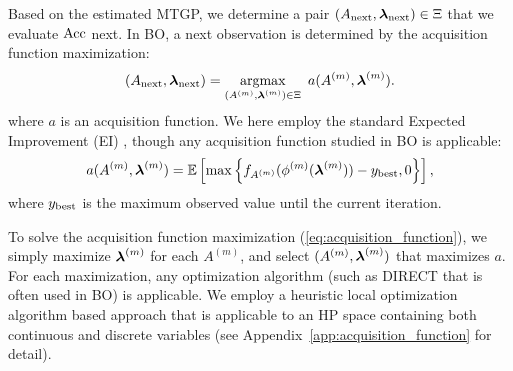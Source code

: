 Based on the estimated MTGP, we determine a pair
$(A_{\mathrm{next}}, \boldsymbol{\lambda}_{\mathrm{next}}) \in \Xi$
that we evaluate $\mathrm{Acc}$ next.
%
In BO, a next observation is determined by the acquisition function maximization: 
\begin{align}
 (A_{\mathrm{next}}, \boldsymbol{\lambda}_{\mathrm{next}}) = 
 \mathop{\text{argmax}}_{( A^{(m)}, \boldsymbol{\lambda}^{(m)} ) \in \Xi} \
 a(A^{(m)}, \boldsymbol{\lambda}^{(m)}). 
 \label{eq:acquisition_function}
\end{align}
where $a$ is an acquisition function. 
%
We here employ the standard Expected Improvement (EI) \cite{brochu2010tutorial}, though any acquisition function studied in BO is applicable:
\begin{align}
 a(A^{(m)}, \boldsymbol{\lambda}^{(m)})
 = 
 \mathbb{E}\left[
 \max \left\{
 f_{A^{(m)}}( \phi^{(m)}( \boldsymbol{\lambda}^{(m)} ) ) - y_{\rm best}, 0
 \right\}
 \right], 
 \label{eq:EI}
\end{align}
where 
$y_{\rm best}$
is the maximum observed value until the current iteration.


To solve the acquisition function maximization 
(\ref{eq:acquisition_function}), 
we simply maximize $\boldsymbol{\lambda}^{(m)}$ for each $A^{(m)}$, and select 
$( A^{(m)}, \boldsymbol{\lambda}^{(m)} )$
that maximizes $a$.
%
For each maximization, any optimization algorithm (such as DIRECT \cite{Jones1993-Lipschitzian} that is often used in BO) is applicable.
%
We employ a heuristic local optimization algorithm \cite{hutter2011sequential} based approach that is applicable to an HP space containing both continuous and discrete variables (see Appendix~\ref{app:acquisition_function} for detail).

